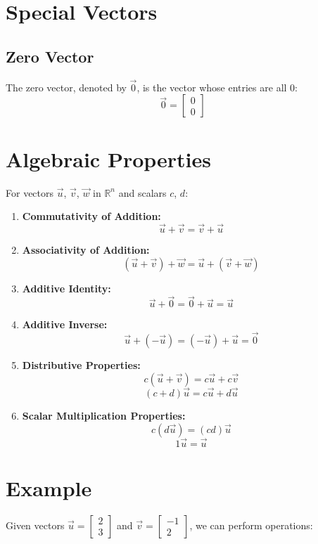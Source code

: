 \documentclass{article}
\begin{document}
\section{Special Vectors}

\subsection{Zero Vector}
The zero vector, denoted by $\vec{0}$, is the vector whose entries are all 0:
\[
\vec{0} = \begin{bmatrix} 0 \\ 0 \end{bmatrix}
\]

\section{Algebraic Properties}
For vectors $\vec{u}$, $\vec{v}$, $\vec{w}$ in $\mathbb{R}^n$ and scalars $c$, $d$:

\begin{enumerate}
    \item \textbf{Commutativity of Addition:}
    \[
    \vec{u} + \vec{v} = \vec{v} + \vec{u}
    \]
    
    \item \textbf{Associativity of Addition:}
    \[
    (\vec{u} + \vec{v}) + \vec{w} = \vec{u} + (\vec{v} + \vec{w})
    \]
    
    \item \textbf{Additive Identity:}
    \[
    \vec{u} + \vec{0} = \vec{0} + \vec{u} = \vec{u}
    \]
    
    \item \textbf{Additive Inverse:}
    \[
    \vec{u} + (-\vec{u}) = (-\vec{u}) + \vec{u} = \vec{0}
    \]
    
    \item \textbf{Distributive Properties:}
    \[
    c(\vec{u} + \vec{v}) = c\vec{u} + c\vec{v}
    \]
    \[
    (c + d)\vec{u} = c\vec{u} + d\vec{u}
    \]
    
    \item \textbf{Scalar Multiplication Properties:}
    \[
    c(d\vec{u}) = (cd)\vec{u}
    \]
    \[
    1\vec{u} = \vec{u}
    \]
\end{enumerate}

\section{Example}
Given vectors $\vec{u} = \begin{bmatrix} 2 \\ 3 \end{bmatrix}$ and $\vec{v} = \begin{bmatrix} -1 \\ 2 \end{bmatrix}$, we can perform operations:
\end{document}
